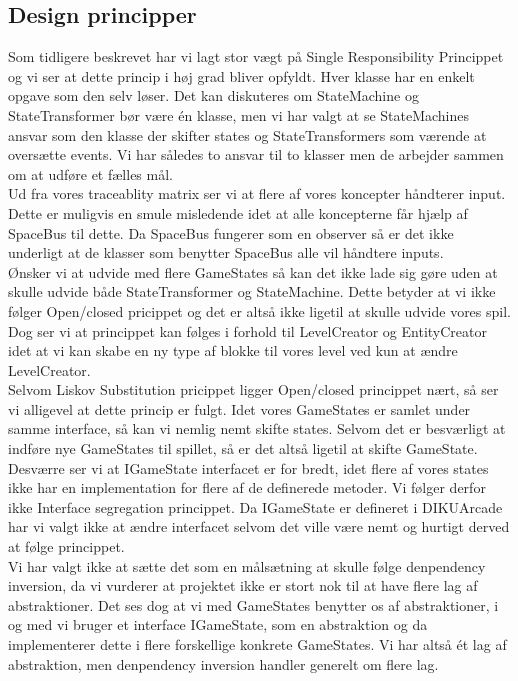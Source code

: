 \subsection{Design principper}
Som tidligere beskrevet har vi lagt stor vægt på Single Responsibility Princippet og vi ser at dette princip i høj grad bliver opfyldt. Hver klasse har en enkelt opgave som den selv løser. Det kan diskuteres om StateMachine og StateTransformer bør være én klasse, men vi har valgt at se StateMachines ansvar som den klasse der skifter states og StateTransformers som værende at oversætte events. Vi har således to ansvar til to klasser men de arbejder sammen om at udføre et fælles mål.\\
Ud fra vores traceablity matrix ser vi at flere af vores koncepter håndterer input. Dette er muligvis en smule misledende idet at alle koncepterne får hjælp af SpaceBus til dette. Da SpaceBus fungerer som en observer så er det ikke underligt at de klasser som benytter SpaceBus alle vil håndtere inputs.\\

Ønsker vi at udvide med flere GameStates så kan det ikke lade sig gøre uden at skulle udvide både StateTransformer og StateMachine. Dette betyder at vi ikke følger Open/closed pricippet og det er altså ikke ligetil at skulle udvide vores spil. Dog ser vi at princippet kan følges i forhold til LevelCreator og EntityCreator idet at vi kan skabe en ny type af blokke til vores level ved kun at ændre LevelCreator.\\

Selvom Liskov Substitution pricippet ligger Open/closed princippet nært, så ser vi alligevel at dette princip er fulgt. Idet vores GameStates er samlet under samme interface, så kan vi nemlig nemt skifte states. Selvom det er besværligt at indføre nye GameStates til spillet, så er det altså ligetil at skifte GameState.\\

Desværre ser vi at IGameState interfacet er for bredt, idet flere af vores states ikke har en implementation for flere af de definerede metoder. Vi følger derfor ikke Interface segregation princippet. Da IGameState er defineret i DIKUArcade har vi valgt ikke at ændre interfacet selvom det ville være nemt og hurtigt derved at følge princippet.\\

Vi har valgt ikke at sætte det som en målsætning at skulle følge denpendency inversion, da vi vurderer at projektet ikke er stort nok til at have flere lag af abstraktioner. Det ses dog at vi med GameStates benytter os af abstraktioner, i og med vi bruger et interface IGameState, som en abstraktion og da implementerer dette i flere forskellige konkrete GameStates. Vi har altså ét lag af abstraktion, men denpendency inversion handler generelt om flere lag. 

